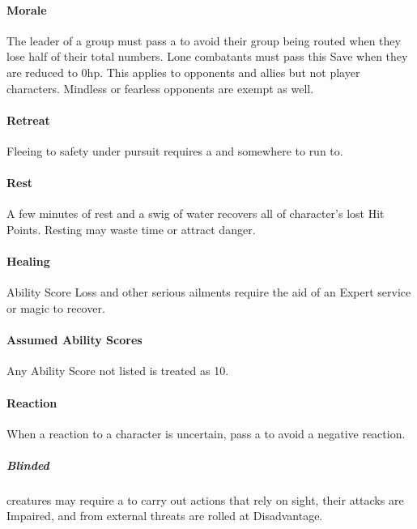 \documentclass[itdr]{subfiles}
\begin{document}
\vfill
\paragraph{Morale}
The leader of a group must pass a  to avoid their group being routed when they lose half of their total numbers. Lone combatants must pass this Save when they are reduced to 0hp. This applies to opponents and allies but not player characters. Mindless or fearless opponents are exempt as well.

\vfill
\paragraph{Retreat}
Fleeing to safety under pursuit requires a  and somewhere to run to.

\vfill
\paragraph{Rest}
A few minutes of rest and a swig of water recovers all of character's lost Hit Points. Resting may waste time or attract danger.

\vfill
\paragraph{Healing}
Ability Score Loss and other serious ailments require the aid of an Expert service or magic to recover.

\vfill
\paragraph{Assumed Ability Scores}
Any Ability Score not listed is treated as 10.

\vfill
\paragraph{Reaction}
When a reaction to a character is uncertain, pass a  to avoid a negative reaction.

\vfill
{}

\subparagraph{Blinded} creatures may require a  to carry out actions that rely on sight, their attacks are Impaired, and  from external threats are rolled at Disadvantage.
\end{document}
